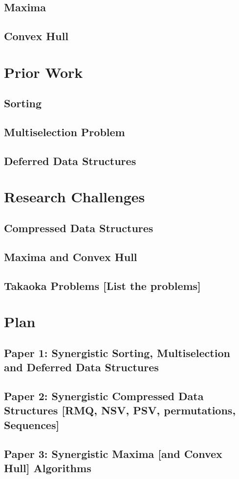 \documentclass[10pt]{article}
\begin{document}
\subsection{Maxima}

\subsection{Convex Hull}

\section{Prior Work}

\subsection{Sorting}

\subsection{Multiselection Problem}

\subsection{Deferred Data Structures}

\section{Research Challenges}

\subsection{Compressed Data Structures}

\subsection{Maxima and Convex Hull}

\subsection{Takaoka Problems [List the problems]}

\section{Plan}

\subsection{Paper 1: Synergistic Sorting, Multiselection and Deferred
  Data Structures}

\subsection{Paper 2: Synergistic Compressed Data Structures [RMQ,
  NSV, PSV, permutations, Sequences]}

\subsection{Paper 3: Synergistic Maxima [and Convex Hull] Algorithms}



\end{document}
